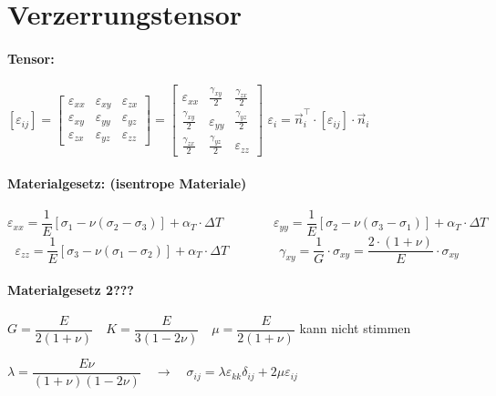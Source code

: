 

\section{Verzerrungstensor}

\paragraph{ Tensor:}
	$ 
	\left[\varepsilon_{ij}\right]
	=
	\left[\begin{matrix}
		\varepsilon_{xx} & \varepsilon_{xy} & \varepsilon_{zx} \\
		\varepsilon_{xy} & \varepsilon_{yy} & \varepsilon_{yz} \\
		\varepsilon_{zx} & \varepsilon_{yz} & \varepsilon_{zz}
	\end{matrix}\right]
	=
	\left[\begin{matrix}
		\varepsilon_{xx}      & \frac{\gamma_{xy}}{2} & \frac{\gamma_{zx}}{2} \\
		\frac{\gamma_{xy}}{2} & \varepsilon_{yy}      & \frac{\gamma_{yz}}{2} \\
		\frac{\gamma_{zx}}{2} & \frac{\gamma_{yz}}{2} & \varepsilon_{zz}
	\end{matrix}\right]
	$
	\hfil
	$ \varepsilon_i = \vec{n}_i^\top \cdot [\varepsilon_{ij}] \cdot \vec{n}_i $
	\hfil
	
\paragraph{ Materialgesetz: (isentrope Materiale)}
	\[ 
		\varepsilon_{xx} = \dfrac{1}{E} \left[\sigma_1 - \nu (\sigma_2 - \sigma_3)\right] + \alpha_T \cdot \Delta T
		\qquad\qquad
		\varepsilon_{yy} = \dfrac{1}{E} \left[\sigma_2 - \nu (\sigma_3 - \sigma_1)\right] + \alpha_T \cdot \Delta T
	\]
	\[
		\varepsilon_{zz} = \dfrac{1}{E} \left[\sigma_3 - \nu (\sigma_1 - \sigma_2)\right] + \alpha_T \cdot \Delta T
		\qquad\qquad
		\gamma_{xy} = \dfrac{1}{G} \cdot \sigma_{xy} = \dfrac{2 \cdot (1 + \nu)}{E} \cdot \sigma_{xy}
	\]
	
\paragraph{ Materialgesetz 2???}
	$       G = \dfrac{E}{2(1+ \nu)} 
	\quad   K = \dfrac{E}{3(1-2\nu)} 
	\quad \mu = \dfrac{E}{2(1+ \nu)}   $ kann nicht stimmen
	
	$
		\lambda = \dfrac{E\nu}{ (1+\nu) (1-2\nu) } 
		\quad \rightarrow \quad
		\sigma_{ij} = \lambda\varepsilon_{kk} \delta_{ij} + 2\mu \varepsilon_{ij}
	$
	
